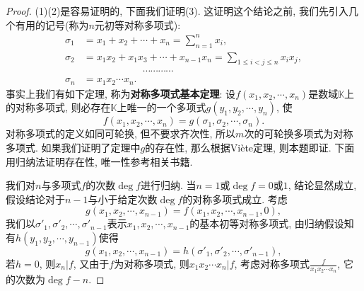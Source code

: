 \begin{quizb}
\begin{quizs}
\end{quizs}
\begin{proof}
(1)(2)是容易证明的, 下面我们证明(3).
这证明这个结论之前, 我们先引入几个有用的记号(称为\(n\)元初等对称多项式):\[\begin{split}
\sigma_1&=x_1+x_2+\cdots+x_n=\sum_{n=1}^{n}x_i,\\
\sigma_2&=x_1x_2+x_1x_3+\cdots+x_{n-1}x_n=\sum_{1\leq i<j\leq n }x_ix_j,\\
&\qquad\qquad\qquad\cdots\cdots\cdots\cdots\\
\sigma_n&=x_1x_2\cdots x_n.
\end{split}\]
事实上我们有如下定理, 称为\textbf{对称多项式基本定理}: 设\(f(x_1,x_2,\cdots,x_n)\)是数域\(\mathbb{K}\)上的对称多项式, 则必存在\(\mathbb{K}\)上唯一的一个多项式\(g(y_1,y_2,\cdots,y_n)\), 使\[f(x_1,x_2,\cdots,x_n)=g(\sigma_1,\sigma_2,\cdots,\sigma_n).\]
对称多项式的定义如同可轮换, 但不要求齐次性, 所以\(m\)次的可轮换多项式为对称多项式. 如果我们证明了定理中\(g\)的存在性, 那么根据Vi\`{e}te定理, 则本题即证. 下面用归纳法证明存在性, 唯一性参考相关书籍.

我们对\(n\)与多项式\(f\)的次数\(\deg f\)进行归纳. 当\(n=1\)或\(\deg f=0\)或\(1\), 结论显然成立, 假设结论对于\(n-1\)与小于给定次数\(\deg f\)的对称多项式成立. 考虑\[g(x_1,x_2,\cdots,x_{n-1})=f(x_1,x_2,\cdots,x_{n-1},0),\]我们以\(\sigma'_1,\sigma'_2,\cdots,\sigma'_{n-1}\)表示\(x_1,x_2,\cdots,x_{n-1}\)的基本初等对称多项式, 由归纳假设知有\(h(y_1,y_2,\cdots,y_{n-1})\)使得\[g(x_1,x_2,\cdots,x_{n-1})=h(\sigma'_1,\sigma'_2,\cdots,\sigma'_{n-1}),\]若\(h=0\), 则\(x_n\big| f\), 又由于\(f\)为对称多项式, 则\(x_1x_2\cdots x_n\big| f\), 考虑对称多项式\(\frac{f}{x_1x_2\cdots x_n}\), 它的次数为\(\deg f -n\). 


\end{proof}
\end{quizb}
